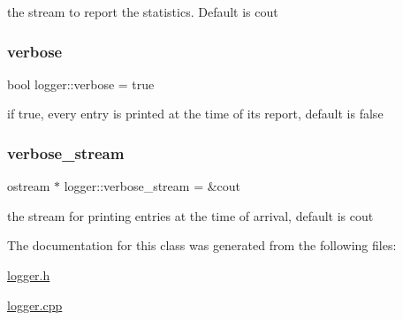 the stream to report the statistics. Default is cout 

\mbox{\label{classlogger_aab3c778c044ddf4b1b5fad8f4c230ff9}} 
\subsubsection{\texorpdfstring{verbose}{verbose}}
{\footnotesize\ttfamily bool logger\+::verbose = true\hspace{0.3cm}{\ttfamily [static]}}



if true, every entry is printed at the time of its report, default is false 

\mbox{\label{classlogger_ae8d04646d8d5244120781025a4d8540b}} 
\subsubsection{\texorpdfstring{verbose\+\_\+stream}{verbose\_stream}}
{\footnotesize\ttfamily ostream $\ast$ logger\+::verbose\+\_\+stream = \&cout\hspace{0.3cm}{\ttfamily [static]}}



the stream for printing entries at the time of arrival, default is cout 



The documentation for this class was generated from the following files\+:\begin{DoxyCompactItemize}
\item 
\hyperlink{logger_8h}{logger.\+h}\item 
\hyperlink{logger_8cpp}{logger.\+cpp}\end{DoxyCompactItemize}
